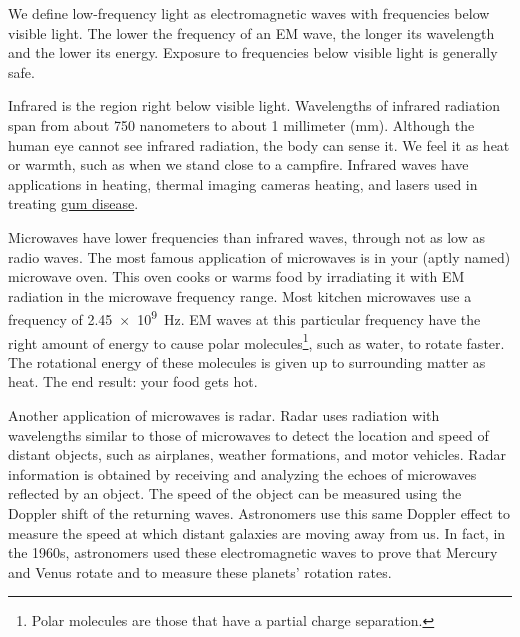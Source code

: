 \documentclass[main.tex]{subfiles}
\begin{document}
We define low-frequency light as electromagnetic waves with frequencies below visible light. The lower the frequency of an EM wave, the longer its wavelength and the lower its energy. Exposure to frequencies below visible light is generally safe. 

\vspace{1em}

Infrared is the region right below visible light. Wavelengths of infrared radiation span from about 750 nanometers to about 1 millimeter (mm). Although the human eye cannot see infrared radiation, the body can sense it. We feel it as heat or warmth, such as when we stand close to a campfire. Infrared waves have applications in heating, thermal imaging cameras heating, and lasers used in treating \href{https://www.tandfonline.com/doi/full/10.1080/13102818.2018.1544034}{gum disease}. 

\vspace{1em}

Microwaves have lower frequencies than infrared waves, through not as low as radio waves. The most famous application of microwaves is in your (aptly named) microwave oven. This oven cooks or warms food by irradiating it with EM radiation in the microwave frequency range. Most kitchen microwaves use a frequency of \SI{2.45e9}{Hz}. EM waves at this particular frequency have the right amount of energy to cause polar molecules\footnote{Polar molecules are those that have a partial charge separation.}, such as water, to rotate faster. The rotational energy of these molecules is given up to surrounding matter as heat. The end result: your food gets hot.

\vspace{1em}

Another application of microwaves is radar. Radar uses radiation with wavelengths similar to those of microwaves to detect the location and speed of distant objects, such as airplanes, weather formations, and motor vehicles. Radar information is obtained by receiving and analyzing the echoes of microwaves reflected by an object. The speed of the object can be measured using the Doppler shift of the returning waves. Astronomers use this same Doppler effect to measure the speed at which distant galaxies are moving away from us. In fact, in the 1960s, astronomers used these electromagnetic waves to prove that Mercury and Venus rotate and to measure these planets' rotation rates.

\vspace{1em}
\end{document}
